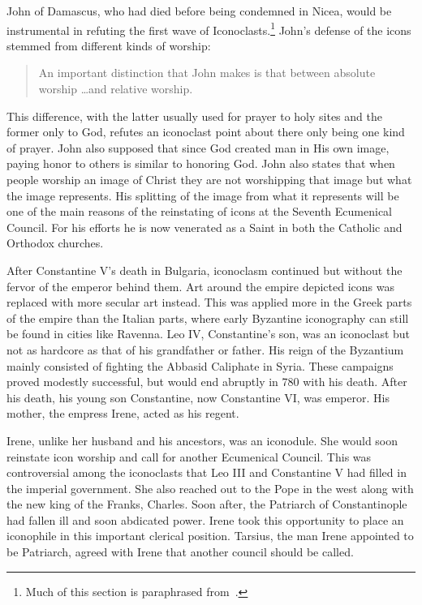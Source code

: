 \documentclass[12pt]{article}
\begin{document}
    John of Damascus, who had died before being condemned in Nicea, would be instrumental in refuting the first wave of Iconoclasts.\footnote{Much of this section is paraphrased from~\cite{JohnDam}.} John's defense of the icons stemmed from different kinds of worship: \begin{quote}
        An important distinction that John makes is that between absolute worship \dots and relative worship.~\cite[p.457]{JohnDam}
    \end{quote}\noindent
    This difference, with the latter usually used for prayer to holy sites and the former only to God, refutes an iconoclast point about there only being one kind of prayer. John also supposed that since God created man in His own image, paying honor to others is similar to honoring God. John also states that when people worship an image of Christ they are not worshipping that image but what the image represents. His splitting of the image from what it represents will be one of the main reasons of the reinstating of icons at the Seventh Ecumenical Council. For his efforts he is now venerated as a Saint in both the Catholic and Orthodox churches. \

    After Constantine V's death in Bulgaria, iconoclasm continued but without the fervor of the emperor behind them. Art around the empire depicted icons was replaced with more secular art instead. This was applied more in the Greek parts of the empire than the Italian parts, where early Byzantine iconography can still be found in cities like Ravenna. Leo IV, Constantine's son, was an iconoclast but not as hardcore as that of his grandfather or father. His reign of the Byzantium mainly consisted of fighting the Abbasid Caliphate in Syria. These campaigns proved modestly successful, but would end abruptly in 780 with his death. After his death, his young son Constantine, now Constantine VI, was emperor. His mother, the empress Irene, acted as his regent. \

    Irene, unlike her husband and his ancestors, was an iconodule. She would soon reinstate icon worship and call for another Ecumenical Council. This was controversial among the iconoclasts that Leo III and Constantine V had filled in the imperial government. She also reached out to the Pope in the west along with the new king of the Franks, Charles. Soon after, the Patriarch of Constantinople had fallen ill and soon abdicated power. Irene took this opportunity to place an iconophile in this important clerical position. Tarsius, the man Irene appointed to be Patriarch, agreed with Irene that another council should be called. \
    
\end{document}
